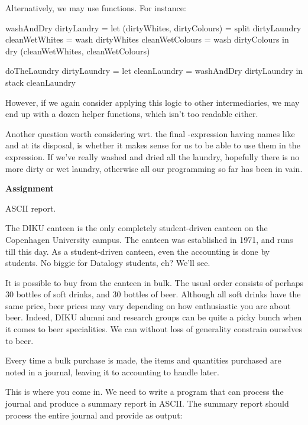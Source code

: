 Alternatively, we may use  functions. For instance:

\begin{code}
washAndDry dirtyLandry =
  let
    (dirtyWhites, dirtyColours) = split dirtyLaundry
    cleanWetWhites = wash dirtyWhites
    cleanWetColours = wash dirtyColours
  in
    dry (cleanWetWhites, cleanWetColours)

doTheLaundry dirtyLaundry =
  let
    cleanLaundry = washAndDry dirtyLaundry
  in
    stack cleanLaundry
\end{code}

However, if we again consider applying this logic to other intermediaries, we
may end up with a dozen helper functions, which isn't too readable either.

Another question worth considering wrt. the final -expression having
names like  and  at its disposal, is
whether it makes sense for us to be able to use them in the expression. If
we've really washed and dried all the laundry, hopefully there is no more dirty
or wet laundry, otherwise all our programming so far has been in vain.




{\bf Assignment}

ASCII report.

The DIKU canteen is the only completely student-driven canteen on the
Copenhagen University campus. The canteen was established in 1971, and runs
till this day. As a student-driven canteen, even the accounting is done by
students. No biggie for Datalogy students, eh? We'll see.

It is possible to buy from the canteen in bulk. The usual order consists of
perhaps 30 bottles of soft drinks, and 30 bottles of beer. Although all soft
drinks have the same price, beer prices may vary depending on how enthusiastic
you are about beer. Indeed, DIKU alumni and research groups can be quite a
picky bunch when it comes to beer specialities. We can without loss of
generality constrain ourselves to beer.

Every time a bulk purchase is made, the items and quantities purchased are
noted in a journal, leaving it to accounting to handle later.

This is where you come in. We need to write a program that can process the
journal and produce a summary report in ASCII. The summary report should
process the entire journal and provide as output:

